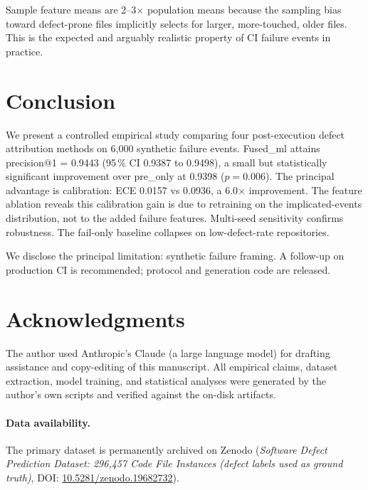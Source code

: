 \documentclass[conference]{IEEEtran}
\begin{document}
Sample feature means are 2--3$\times$ population means because the
sampling bias toward defect-prone files implicitly selects for
larger, more-touched, older files. This is the expected and
arguably realistic property of CI failure events in practice.

\section{Conclusion}
\label{sec:conclusion}
\FloatBarrier

We present a controlled empirical study comparing four
post-execution defect attribution methods on 6{,}000 synthetic
failure events. Fused\_ml attains precision@1 = 0.9443 (95\,\% CI
0.9387 to 0.9498), a small but statistically significant
improvement over pre\_only at 0.9398 ($p = 0.006$). The principal
advantage is calibration: ECE 0.0157 vs 0.0936, a 6.0$\times$
improvement. The feature ablation reveals this calibration gain is
due to retraining on the implicated-events distribution, not to the
added failure features. Multi-seed sensitivity confirms robustness.
The fail-only baseline collapses on low-defect-rate repositories.

We disclose the principal limitation: synthetic failure framing.
A follow-up on production CI is recommended; protocol and
generation code are released.


\section*{Acknowledgments}
The author used Anthropic's Claude (a large language model) for drafting assistance and copy-editing of this manuscript. All empirical claims, dataset extraction, model training, and statistical analyses were generated by the author's own scripts and verified against the on-disk artifacts.

\paragraph*{Data availability.} The primary dataset is permanently archived on Zenodo (\textit{Software Defect Prediction Dataset: 296,457 Code File Instances (defect labels used as ground truth)}, DOI: \href{https://doi.org/10.5281/zenodo.19682732}{10.5281/zenodo.19682732}).



\end{document}
